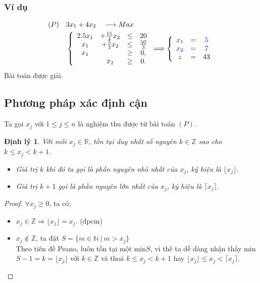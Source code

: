 \documentclass[12pt,a4paper]{report}
\newtheorem{dl}{Định lý}
\begin{document}
\subsubsection*{Ví dụ}
        \begin{equation}
        \begin{split}
            (P) \quad & 3x_1 + 4x_2 \quad \longrightarrow Max \\
            & \left\{\begin{array} {cccc}
            2.5x_1 &+ \frac{15}{4}x_2 &\leq& 20 \\
            x_1 &+ \frac{5}{3}x_2 &\leq& \frac{50}{3} \\
            x_1 &&\geq &0, \\
            &x_2 &\geq& 0. \\
            \end{array}\right.
            \Longrightarrow
            \left\{\begin{array}{ccc}
            \color{blue} x_1 &\color{blue} = &\color{blue}5 \\
            \color{blue} x_2 &\color{blue} = &\color{blue}7 \\
            z& =&43
        \end{array}\right.
        \end{split}
        \end{equation}
    Bài toán được giải.

\subsection*{Phương pháp xác định cận}
Ta gọi $x_j$ với $1 \leq j \leq n$ là nghiệm thu được từ bài toán $(P)$.
\begin{dl}\label{cmnguyen}
	\phantom{}
Với mỗi $x_j \in \mathbb{R}$, tồn tại duy nhất số nguyên $k \in \mathbb{Z}$ sao cho $k \leq x_j < k+1$.
\begin{itemize}
\item Giá trị $k$ khi đó ta gọi là phần nguyên nhỏ nhất của $x_j$, ký hiệu là $\lfloor x_j \rfloor$.
\item Giá trị $k+1$ gọi là phần nguyên lớn nhất của $x_j$, ký hiệu là $\lceil x_j \rceil$.
\end{itemize}
\end{dl}



\begin{proof}
$\forall x_j \geq 0$, ta có:
\begin{itemize}
\item $x_j \in \mathbb{Z} \Rightarrow \lfloor x_j \rfloor =x_j$. (đpcm)
\item $x_j \notin \mathbb{Z}$, ta đặt $S=\{ m \in \mathbb{N} \: \vert \: m > x_j \}$ \\ Theo tiên đề Peano, luôn tồn tại một min$S$, vì thế ta dễ dàng nhận thấy min$S -1=k=\lfloor x_j \rfloor$ với $k \in \mathbb{Z}$ và thoả $k \leq x_j < k+1$ hay $\lfloor x_j \rfloor \leq x_j <\lceil x_j \rceil$. 
\end{itemize}
\end{proof}
\end{document}
